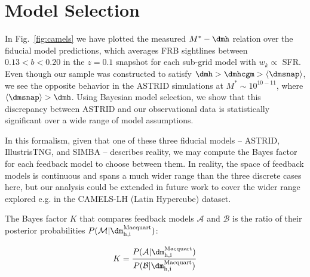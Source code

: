\section{Model Selection}
In Fig.~\ref{fig:camels} we have plotted the measured $M^*-\dmh$ relation over the fiducial model predictions, which averages FRB sightlines between $0.13 < b < 0.20$ in the $z = 0.1$ snapshot for each sub-grid model with $w_k \propto$ SFR. 
Even though our sample was constructed to satisfy $\dmh > \dmhcgm > \langle \dmsnap \rangle$, we see the opposite behavior in the ASTRID simulations at $M^* \sim 10^{10-11}$, where $\langle \dmsnap \rangle > \dmh$.
Using Bayesian model selection, we show that this discrepancy between ASTRID and our observational data is statistically significant over a wide range of model assumptions.

In this formalism, given that one of these three fiducial models -- ASTRID, IllustrisTNG, and SIMBA -- describes reality, we may compute the Bayes factor for each feedback model to choose between them. In reality, the space of feedback models is continuous and spans a much wider range than the three discrete cases here, but our analysis could be extended in future work to cover the wider range explored e.g. in the CAMELS-LH (Latin Hypercube) dataset.

The Bayes factor $K$ that compares feedback models $\mathcal{A}$ and $\mathcal{B}$ is the ratio of their posterior probabilities $P(\mathcal{M} | \dm^\mathrm{Macquart}_{\mathrm{h,i}})$:

\begin{equation}
    K = \dfrac{P(\mathcal{A} | \dm^\mathrm{Macquart}_{\mathrm{h,i}})}{P(\mathcal{B} | \dm^\mathrm{Macquart}_{\mathrm{h,i}})}
    \label{eq:kdef}
\end{equation}

